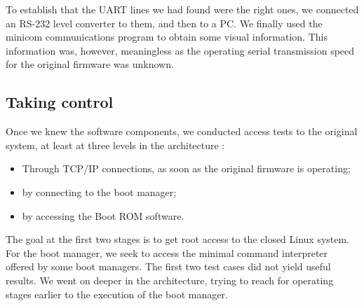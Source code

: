 \documentclass[conference]{IEEEtran}
\newcommand{\nota}[1]{}
\begin{document}
To establish that the UART lines we had found were the right ones, we connected an RS-232 level converter to them, and then to a PC. We finally used the minicom communications program to obtain some visual information. This information was, however, meaningless as the operating serial transmission speed for the original firmware was unknown. 

\subsection{Taking control}
\nota {
Conociendo los componentes de software, se realizaron pruebas
de acceso al sistema original en al menos tres niveles de la arquitectura:
\begin{itemize}
\item A través de conexiones TCP/IP una vez que el firmware original está en ejecución,
\item a través del conexiones al gestor de arranque,
\item a través de accesos al software del Boot ROM.
\end{itemize}
}

Once we knew the software components, we conducted access tests to the original system, at least at three levels in the architecture :
\begin{itemize}
\item Through TCP/IP connections, as soon as the original firmware is operating;
\item by connecting to the boot manager;
\item by accessing the Boot ROM software.
\end{itemize}

\nota { En los primeros dos casos no se tuvieron resultados promisorios.
La tarea en estos puntos es obtener acceso como administrador del sistema
Linux cerrado. O en el caso del gestor de arranque, se busca
el acceso al interprete de comandos mínimo, que algunos gestores proveen.
Por lo que se continuó a mas bajo nivel, para obtener acceso a niveles
anteriores a la ejecución del gestor de arranque.}

The goal at the first two stages is to get root access to the closed Linux system. For the boot manager, we seek to access the minimal command interpreter offered by some boot managers. The first two test cases did not yield useful results. We went on deeper in the architecture, trying to reach for operating stages earlier to the execution of the boot manager.
\end{document}
